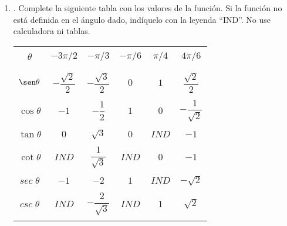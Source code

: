 \begin{enumerate}
\item . Complete la siguiente tabla con los valores de la función. Si la función no está definida en el ángulo dado, indíquelo con la leyenda “IND”. No use calculadora ni tablas.
    \begin{center}
	\begin{tabular}{cccccc}
	    \hline\\
	    $\theta$&$-3\pi/2$&$-\pi/3$&$-\pi/6$&$\pi/4$&$4\pi/6$\\\\
	    \hline\\
	    $\sen \theta$&$-\dfrac{\sqrt{2}}{2}$&$-\dfrac{\sqrt{3}}{2}$&$0$&$1$&$\dfrac{\sqrt{2}}{2}$\\\\
	    $\cos \theta$&$-1$&$-\dfrac{1}{2}$&$1$&$0$&$-\dfrac{1}{\sqrt{2}}$\\\\
	    $\tan \theta$&$0$&$\sqrt{3}$&$0$&$IND$&$-1$\\\\
	    $\cot \theta$&$IND$&$\dfrac{1}{\sqrt{3}}$&$IND$&$0$&$-1$\\\\
	    $sec\; \theta$&$-1$&$-2$&$1$&$IND$&$-\sqrt{2}$\\\\
	    $csc\; \theta$&$IND$&$-\dfrac{2}{\sqrt{3}}$&$IND$&$1$&$\sqrt{2}$\\\\
	    \hline
	\end{tabular}
    \end{center}

\end{enumerate}
